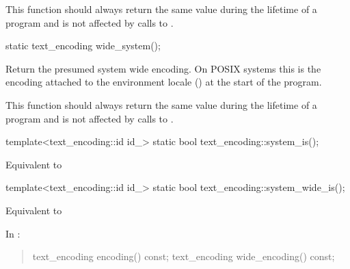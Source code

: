 \documentclass{wg21}
\begin{document}
\begin{addedblock}
\begin{itemdescr}
\begin{note}
This function should always return the same value during the lifetime of a program and is not affected by calls to .
\end{note}
\end{itemdescr}

\begin{itemdecl}
static text_encoding wide_system();
\end{itemdecl}

\begin{itemdescr}
Return the presumed system wide encoding.
On POSIX systems this is the encoding attached to the environment locale () at the start of the program.

\begin{note}
This function should always return the same value during the lifetime of a program and is not affected by calls to .
\end{note}
\end{itemdescr}

\begin{itemdecl}
template<text_encoding::id id_>
static bool text_encoding::system_is();
\end{itemdecl}

\begin{itemdescr}
\returns Equivalent to 
\end{itemdescr}

\begin{itemdecl}
template<text_encoding::id id_>
static bool text_encoding::system_wide_is();
\end{itemdecl}

\begin{itemdescr}
\returns Equivalent to 
\end{itemdescr}


\end{addedblock}

In \tcode{[locale]}:

\begin{quote}
\begin{codeblock}
namespace std {
  class locale {
  public:
    [...]

    // locale operations
    string name() const;
\end{codeblock}
\begin{addedblock}
\begin{codeblock}
    text_encoding encoding() const;
    text_encoding wide_encoding() const;
\end{codeblock}
\end{addedblock}
\begin{codeblock}
  };
}
\end{codeblock}
\end{quote}
\end{document}
